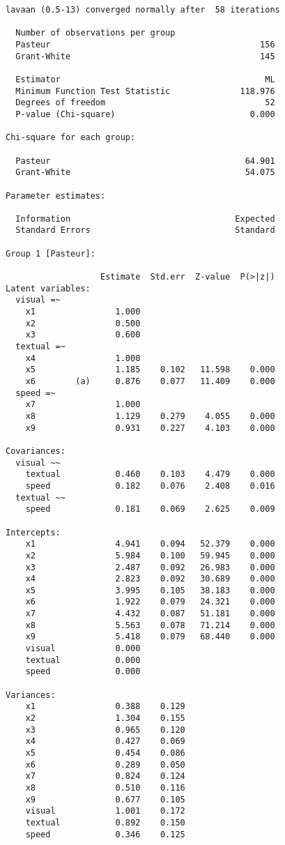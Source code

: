 \begin{verbatim}
lavaan (0.5-13) converged normally after  58 iterations

  Number of observations per group         
  Pasteur                                          156
  Grant-White                                      145

  Estimator                                         ML
  Minimum Function Test Statistic              118.976
  Degrees of freedom                                52
  P-value (Chi-square)                           0.000

Chi-square for each group:

  Pasteur                                       64.901
  Grant-White                                   54.075

Parameter estimates:

  Information                                 Expected
  Standard Errors                             Standard

Group 1 [Pasteur]:

                   Estimate  Std.err  Z-value  P(>|z|)
Latent variables:
  visual =~
    x1                1.000
    x2                0.500
    x3                0.600
  textual =~
    x4                1.000
    x5                1.185    0.102   11.598    0.000
    x6        (a)     0.876    0.077   11.409    0.000
  speed =~
    x7                1.000
    x8                1.129    0.279    4.055    0.000
    x9                0.931    0.227    4.103    0.000

Covariances:
  visual ~~
    textual           0.460    0.103    4.479    0.000
    speed             0.182    0.076    2.408    0.016
  textual ~~
    speed             0.181    0.069    2.625    0.009

Intercepts:
    x1                4.941    0.094   52.379    0.000
    x2                5.984    0.100   59.945    0.000
    x3                2.487    0.092   26.983    0.000
    x4                2.823    0.092   30.689    0.000
    x5                3.995    0.105   38.183    0.000
    x6                1.922    0.079   24.321    0.000
    x7                4.432    0.087   51.181    0.000
    x8                5.563    0.078   71.214    0.000
    x9                5.418    0.079   68.440    0.000
    visual            0.000
    textual           0.000
    speed             0.000

Variances:
    x1                0.388    0.129
    x2                1.304    0.155
    x3                0.965    0.120
    x4                0.427    0.069
    x5                0.454    0.086
    x6                0.289    0.050
    x7                0.824    0.124
    x8                0.510    0.116
    x9                0.677    0.105
    visual            1.001    0.172
    textual           0.892    0.150
    speed             0.346    0.125




\end{verbatim}
